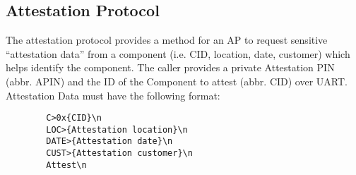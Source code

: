 \subsection{Attestation Protocol}

The attestation protocol provides a method for an AP to request sensitive ``attestation data'' from a component (i.e. CID, location, date, customer) which helps identify the component. The caller provides a private Attestation PIN (abbr. APIN) and the ID of the Component to attest (abbr. CID) over UART. Attestation Data must have the following format:
    \begin{verbatim}
        C>0x{CID}\n
        LOC>{Attestation location}\n
        DATE>{Attestation date}\n
        CUST>{Attestation customer}\n
        Attest\n\end{verbatim}


